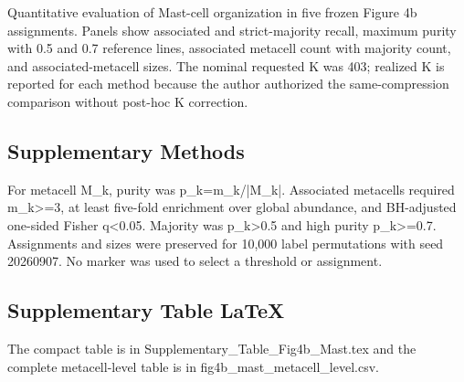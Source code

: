 Quantitative evaluation of Mast-cell organization in five frozen Figure 4b
assignments. Panels show associated and strict-majority recall, maximum purity
with 0.5 and 0.7 reference lines, associated metacell count with majority count,
and associated-metacell sizes. The nominal requested K was 403; realized K is
reported for each method because the author authorized the same-compression
comparison without post-hoc K correction.

\subsection*{Supplementary Methods}

For metacell M_k, purity was p_k=m_k/|M_k|. Associated metacells required
m_k>=3, at least five-fold enrichment over global abundance, and BH-adjusted
one-sided Fisher q<0.05. Majority was p_k>0.5 and high purity p_k>=0.7.
Assignments and sizes were preserved for 10,000 label permutations with seed
20260907. No marker was used to select a threshold or assignment.

\subsection*{Supplementary Table LaTeX}

The compact table is in Supplementary_Table_Fig4b_Mast.tex and the complete
metacell-level table is in fig4b_mast_metacell_level.csv.
